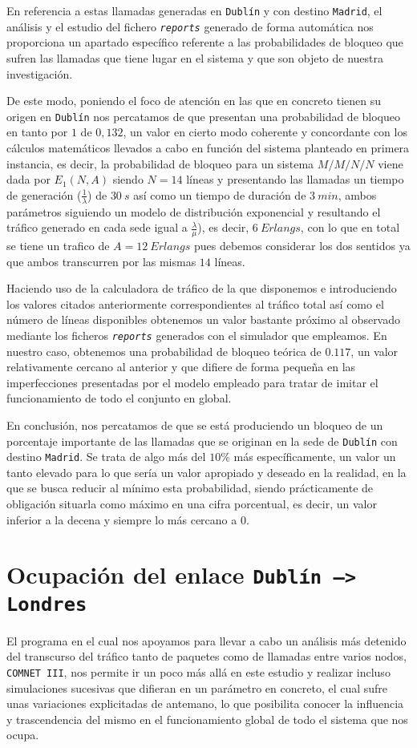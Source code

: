 \documentclass{article}[10pt]
\begin{document}
		En referencia a estas llamadas generadas en \texttt{Dublín} y con destino \texttt{Madrid}, el análisis y el estudio del fichero \texttt{\textit{reports}} generado de forma automática nos proporciona un apartado específico referente a las probabilidades de bloqueo que sufren las llamadas que tiene lugar en el sistema y que son objeto de nuestra investigación.

		De este modo, poniendo el foco de atención en las que en concreto tienen su origen en \texttt{Dublín} nos percatamos de que presentan una probabilidad de bloqueo en tanto por $1$ de $0,132$, un valor en cierto modo coherente y concordante con los cálculos matemáticos llevados a cabo en función del sistema planteado en primera instancia, es decir, la probabilidad de bloqueo para un sistema $M/M/N/N$ viene dada por $E_1(N, A)$ siendo $N = 14$ líneas y presentando las llamadas un tiempo de generación ($\frac{1}{\lambda}$) de $30\ s$ así como un tiempo de duración de $3\ min$, ambos parámetros siguiendo un modelo de distribución exponencial y resultando el tráfico generado en cada sede igual a $\frac{\lambda}{\mu}$), es decir, $6\ Erlangs$, con lo que en total se tiene un trafico de $A = 12\ Erlangs$ pues debemos considerar los dos sentidos ya que ambos transcurren por las mismas $14$ líneas.

		Haciendo uso de la calculadora de tráfico de la que disponemos e introduciendo los valores citados anteriormente correspondientes al tráfico total así como el número de líneas disponibles obtenemos un valor bastante próximo al observado mediante los ficheros \texttt{\textit{reports}} generados con el simulador que empleamos. En nuestro caso, obtenemos una probabilidad de bloqueo teórica de $0.117$, un valor relativamente cercano al anterior y que difiere de forma pequeña en las imperfecciones presentadas por el modelo empleado para tratar de imitar el funcionamiento de todo el conjunto en global.

		En conclusión, nos percatamos de que se está produciendo un bloqueo de un porcentaje importante de las llamadas que se originan en la sede de \texttt{Dublín} con destino \texttt{Madrid}. Se trata de algo más del $10\%$ más específicamente, un valor un tanto elevado para lo que sería un valor apropiado y deseado en la realidad, en la que se busca reducir al mínimo esta probabilidad, siendo prácticamente de obligación situarla como máximo en una cifra porcentual, es decir, un valor inferior a la decena y siempre lo más cercano a $0$.

	\section{Ocupación del enlace \texttt{Dublín --> Londres}}
		El programa en el cual nos apoyamos para llevar a cabo un análisis más detenido del transcurso del tráfico tanto de paquetes como de llamadas entre varios nodos, \texttt{COMNET III}, nos permite ir un poco más allá en este estudio y realizar incluso simulaciones sucesivas que difieran en un parámetro en concreto, el cual sufre unas variaciones explicitadas de antemano, lo que posibilita conocer la influencia y trascendencia del mismo en el funcionamiento global de todo el sistema que nos ocupa.
\end{document}
